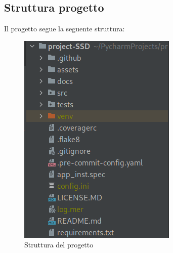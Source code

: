 \subsection{Struttura progetto}
Il progetto segue la seguente struttura:
\begin{figure}[H]
    \centering
    \includegraphics[scale = 0.5]{components/img/struttura-cartella-ssd.png}
    \caption{Struttura del progetto}
    \label{fig:Struttura del progetto}
\end{figure}  
